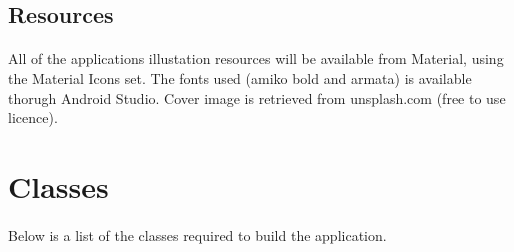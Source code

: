 \documentclass{article}
\begin{document}
\newpage

\subsection{Resources}
\paragraph{}
    All of the applications illustation resources will be available from Material, using the Material Icons set. 
    The fonts used (amiko bold and armata) is available thorugh Android Studio.
    Cover image is retrieved from unsplash.com (free to use licence).

    \hfill \break

    \section{Classes}
        \paragraph{}
        Below is a list of the classes required to build the application.

        \hfill \break
\end{document}
